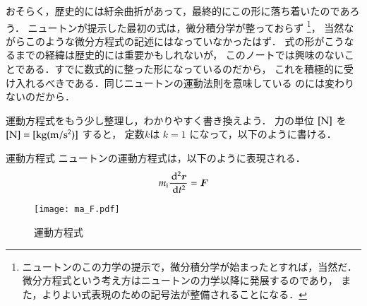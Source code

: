                 おそらく，歴史的には紆余曲折があって，最終的にこの形に落ち着いたのであろう．
                ニュートンが提示した最初の式は，微分積分学が整っておらず
                  \footnote{
                    ニュートンのこの力学の提示で，微分積分学が始まったとすれば，当然だ．
                    微分方程式という考え方はニュートンの力学以降に発展するのであり，
                    また，よりよい式表現のための記号法が整備されることになる．
                  }，
                当然ながらこのような微分方程式の記述にはなっていなかったはず．
                式の形がこうなるまでの経緯は歴史的には重要かもしれないが，
                このノートでは興味のないことである．すでに数式的に整った形になっているのだから，
                これを積極的に受け入れるべきである．同じニュートンの運動法則を意味している
                のには変わりないのだから．

                運動方程式をもう少し整理し，わかりやすく書き換えよう．
                力の単位 $[\rm{N}]$ を$[\rm{N}] = [\rm{kg (m/s^{2})}]$ すると，
                定数$k$は $k=1$ になって，以下のように書ける．
                        \begin{myshadebox}{運動方程式}
                            ニュートンの運動方程式は，以下のように表現される．
                            \begin{align}\label{eq:N_eq}
                            m_{\rm{i}}\frac{\df^{2}\br}{\df t^{2}} = \bF
                            \end{align}
                        \end{myshadebox}
                        \begin{figure}[hbt]
                            \begin{center}
                                \texttt{[image: ma\_F.pdf]}
                                \caption{運動方程式}
                                \label{fig:ma_F}
                            \end{center}
                        \end{figure}

